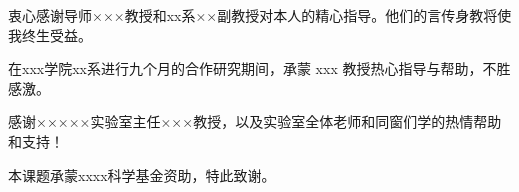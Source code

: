 
\begin{acknowledgements}
  衷心感谢导师×××教授和xx系××副教授对本人的精心指导。他们的言传身教将使我终生受益。

  在xxx学院xx系进行九个月的合作研究期间，承蒙 xxx 教授热心指导与帮助，不胜感激。

  感谢×××××实验室主任×××教授，以及实验室全体老师和同窗们学的热情帮助和支持！

  本课题承蒙xxxx科学基金资助，特此致谢。
\end{acknowledgements}
